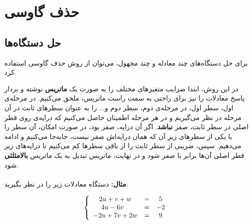 \chapter{ حذف گاوسی}

\section{حل دستگاه‌ها}
برای حل دستگاه‌های چند معادله و چند مجهول، می‌توان از روش حذف گاوسی%
استفاده کرد.

در این روش، ابتدا ضرایب متغیرهای مختلف را به صورت یک \textbf{ماتریس} نوشته و بردار پاسخ معادلات را نیز برای راحتی به سمت راست ماتریس، ملحق  می‌کنیم. در مرحله‌ی اول، سطر اول، در مرحله‌ی دوم، سطر دوم و... را به عنوان سطرهای ثابت در آن مرحله در نظر می‌گیریم و در هر مرحله اطمینان حاصل می‌کنیم که درایه‌ی روی قطر اصلی در سطر ثابت، صفر \textbf{نباشد}. اگر آن درایه، صفر بود، در صورت امکان، آن سطر را با یکی از سطرهای زیر آن که همان درایه‌اش صفر نیست، جا‌به‌جا می‌کنیم و ادامه می‌دهیم. سپس، ضریبی از سطر ثابت را از باقی سطرها کم می‌کنیم تا درایه‌های زیر قطر اصلی آن‌ها برابر با صفر شود و در نهایت، ماتریس تبدیل به یک ماتریس \textbf{بالامثلثی} شود.\\\\
\textbf{مثال:}
دستگاه معادلات زیر را در نظر بگیرید:

\[
\left\{
\begin{array}{cccc@{\qquad}l}
2u  +  v +  w &=&  5 \\
4u - 6v \; \; \;  &=& -2\\
-2u + 7v + 2w &=& 9
\end{array}
\right.
\]

